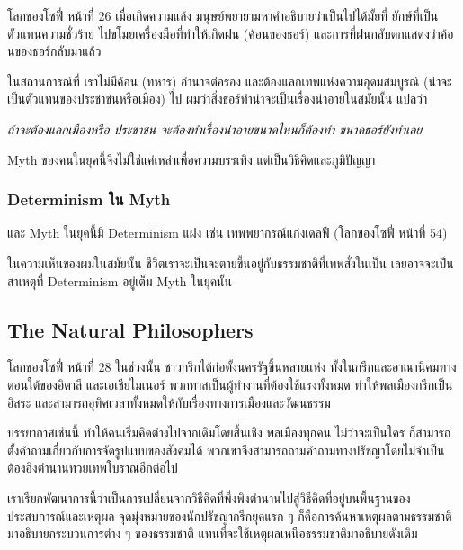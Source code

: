 \begin{note}

\begin{bookquote}{โลกของโซฟี่ หน้าที่ 26}
เมื่อเกิดความแล้ง มนุษย์พยายามหาคำอธิบายว่าเป็นไปได้มั้ยที่ ยักษ์ที่เป็นตัวแทนความชั่วร้าย ไปขโมยเครื่องมือที่ทำให้เกิดฝน (ค้อนของธอร์) และการที่ฝนกลับตกแสดงว่าค้อนของธอร์กลับมาแล้ว
\end{bookquote}

\end{note}

\begin{note}
ในสถานการณ์ที่ เราไม่มีค้อน (ทหาร) อำนาจต่อรอง
และต้องแลกเทพแห่งความอุดมสมบูรณ์ (น่าจะเป็นตัวแทนของประชาชนหรือเมือง) ไป
ผมว่าสิ่งธอร์ทำน่าจะเป็นเรื่องน่าอายในสมัยนั้น แปลว่า

\begin{center}
\itshape ถ้าจะต้องแลกเมืองหรือ ประชาชน จะต้องทำเรื่องน่าอายขนาดไหนก็ต้องทำ ขนาดธอร์ยังทำเลย
\end{center}

Myth ของคนในยุคนี้จึงไม่ใช่แค่เหล่าเพื่อความบรรเทิง แต่เป็นวิธีคิดและภูมิปัญญา
\end{note}

\subsubsection{Determinism ใน Myth}

และ Myth ในยุคนี้มี Determinism แฝง เช่น
เทพพยากรณ์แก่งเดลฟี (โลกของโซฟี่ หน้าที่ 54)

\begin{note}
ในความเห็นของผมในสมัยนั้น ชีวิตเราจะเป็นจะตายขึ้นอยู่กับธรรมชาติที่เทพสั่งในเป็น
เลยอาจจะเป็นสาเหตุที่ Determinism อยู่เต็ม Myth ในยุคนั้น
\end{note}

\subsection{The Natural Philosophers}

\begin{bookquote}{โลกของโซฟี่ หน้าที่ 28}
ในช่วงนั้น ชาวกรีกได้ก่อตั้งนครรัฐขึ้นหลายแห่ง ทั้งในกรีกและอาณานิคมทางตอนใต้ของอิตาลี และเอเชียไมเนอร์ พวกทาสเป็นผู้ทำงานที่ต้องใช้แรงทั้งหมด ทำให้พลเมืองกรีกเป็นอิสระ และสามารถอุทิศเวลาทั้งหมดให้กับเรื่องทางการเมืองและวัฒนธรรม

บรรยากาศเช่นนี้ ทำให้คนเริ่มคิดต่างไปจากเดิมโดยสิ้นเชิง พลเมืองทุกคน ไม่ว่าจะเป็นใคร ก็สามารถตั้งคำถามเกี่ยวกับการจัดรูปแบบของสังคมได้ พวกเขาจึงสามารถถามคำถามทางปรัชญาโดยไม่จำเป็นต้องอิงตำนานทวยเทพโบราณอีกต่อไป

เราเรียกพัฒนาการนี้ว่าเป็นการเปลี่ยนจากวิธีคิดที่พึ่งพิงตำนานไปสู่วิธีคิดที่อยู่บนพื้นฐานของประสบการณ์และเหตุผล จุดมุ่งหมายของนักปรัชญากรีกยุคแรก ๆ ก็คือการค้นหาเหตุผลตามธรรมชาติมาอธิบายกระบวนการต่าง ๆ ของธรรมชาติ แทนที่จะใช้เหตุผลเหนือธรรมชาติมาอธิบายดังเดิม
\end{bookquote}

